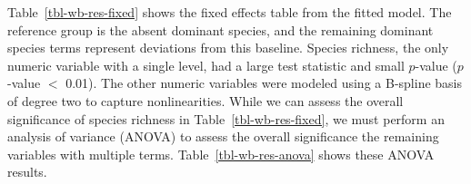 \documentclass[
  letterpaper,
  DIV=11,
  numbers=noendperiod]{scrartcl}
\begin{document}
\begin{table}
{}

\end{table}%

Table~\ref{tbl-wb-res-fixed} shows the fixed effects table from the
fitted model. The reference group is the absent dominant species, and
the remaining dominant species terms represent deviations from this
baseline. Species richness, the only numeric variable with a single
level, had a large test statistic and small \(p\)-value (\(p\)-value
\(<\) 0.01). The other numeric variables were modeled using a B-spline
basis of degree two to capture nonlinearities. While we can assess the
overall significance of species richness in
Table~\ref{tbl-wb-res-fixed}, we must perform an analysis of variance
(ANOVA) to assess the overall significance the remaining variables with
multiple terms. Table~\ref{tbl-wb-res-anova} shows these ANOVA results.

\begin{table}

\caption{\label{tbl-wb-res-anova}ANOVA table of covariates in the Wide
Bay resilience model.}


\end{table}%
\end{document}
